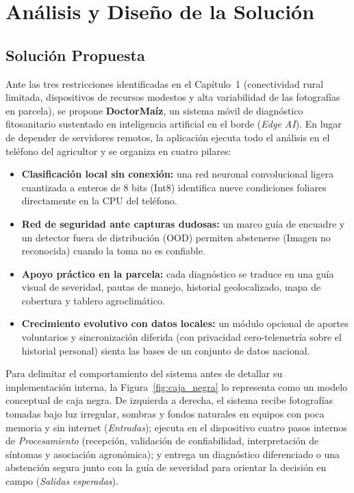 \chapter{An\'alisis y Dise\~no de la Soluci\'on}

\section{Soluci\'on Propuesta}

Ante las tres restricciones identificadas en el Cap\'itulo~1 (conectividad rural limitada, dispositivos de recursos modestos y alta variabilidad de las fotograf\'ias en parcela), se propone \textbf{DoctorMa\'iz}, un sistema m\'ovil de diagn\'ostico fitosanitario sustentado en inteligencia artificial en el borde (\textit{Edge AI}). En lugar de depender de servidores remotos, la aplicaci\'on ejecuta todo el an\'alisis en el tel\'efono del agricultor y se organiza en cuatro pilares:

\begin{itemize}
\item \textbf{Clasificaci\'on local sin conexi\'on:} una red neuronal convolucional ligera cuantizada a enteros de 8 bits (Int8) identifica nueve condiciones foliares directamente en la CPU del tel\'efono.
\item \textbf{Red de seguridad ante capturas dudosas:} un marco gu\'ia de encuadre y un detector fuera de distribuci\'on (OOD) permiten abstenerse (\guillemotleft Imagen no reconocida\guillemotright) cuando la toma no es confiable.
\item \textbf{Apoyo pr\'actico en la parcela:} cada diagn\'ostico se traduce en una gu\'ia visual de severidad, pautas de manejo, historial geolocalizado, mapa de cobertura y tablero agroclim\'atico.
\item \textbf{Crecimiento evolutivo con datos locales:} un m\'odulo opcional de aportes voluntarios y sincronizaci\'on diferida (con privacidad cero-telemetr\'ia sobre el historial personal) sienta las bases de un conjunto de datos nacional.
\end{itemize}

Para delimitar el comportamiento del sistema antes de detallar su implementaci\'on interna, la Figura~\ref{fig:caja_negra} lo representa como un modelo conceptual de caja negra. De izquierda a derecha, el sistema recibe fotograf\'ias tomadas bajo luz irregular, sombras y fondos naturales en equipos con poca memoria y sin internet (\textit{Entradas}); ejecuta en el dispositivo cuatro pasos internos de \textit{Procesamiento} (recepci\'on, validaci\'on de confiabilidad, interpretaci\'on de s\'intomas y asociaci\'on agron\'omica); y entrega un diagn\'ostico diferenciado o una abstenci\'on segura junto con la gu\'ia de severidad para orientar la decisi\'on en campo (\textit{Salidas esperadas}).

